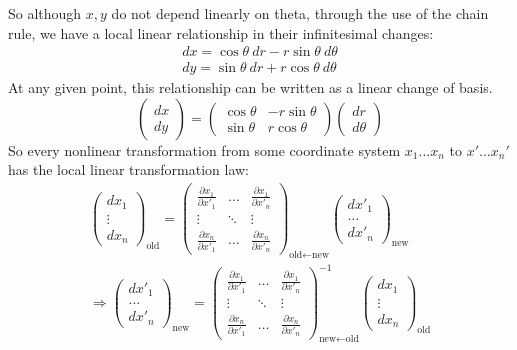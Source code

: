 \documentclass[../master.tex]{subfiles}
\begin{document}
	So although $x,y$ do not depend linearly on theta, through the use of the chain rule, we have a local linear relationship in their infinitesimal changes:
	\begin{align*}
		dx = \cos \theta ~dr - r \sin \theta ~d\theta\\
		dy = \sin \theta ~dr + r \cos \theta ~d\theta
	\end{align*}
	At any given point, this relationship can be written as a linear change of basis.
	\begin{equation*}
		\begin{pmatrix}
			dx \\ dy
		\end{pmatrix}
		 = 
		 \begin{pmatrix}
		 	\cos \theta & - r \sin \theta \\
			\sin \theta & r \cos \theta
		 \end{pmatrix}
		 \begin{pmatrix}
		 	dr \\
			d\theta
		 \end{pmatrix}
	\end{equation*}
	So every nonlinear transformation from some coordinate system $x_1 \dots x_n$ to $x' \dots x_n'$ has the local linear transformation law:
	\begin{align*}
		\begin{pmatrix}
			dx_1 \\ \vdots \\ dx_n 
		\end{pmatrix}_{\text{old}}
		=
	 \begin{pmatrix}
	 	\frac{\partial x_1}{\partial x'_1} & \dots & \frac{\partial x_1}{\partial x'_n} \\
		\vdots & \ddots & \vdots \\
		\frac{\partial x_n}{\partial x'_1} & \dots & \frac{\partial x_n}{\partial x'_n}
	 \end{pmatrix}_{\text{old} \leftarrow \text{new}}
	 \begin{pmatrix}
	 	dx'_1 \\ \dots \\ dx'_n
	 \end{pmatrix}_{\text{new}}\\
	 \Rightarrow 
	 \begin{pmatrix}
	 	dx'_1 \\ \dots \\ dx'_n
	 \end{pmatrix}_{\text{new}}
		=
	 \begin{pmatrix}
	 	\frac{\partial x_1}{\partial x'_1} & \dots & \frac{\partial x_1}{\partial x'_n} \\
		\vdots & \ddots & \vdots \\
		\frac{\partial x_n}{\partial x'_1} & \dots & \frac{\partial x_n}{\partial x'_n}
	 \end{pmatrix}^{-1}_{\text{new} \leftarrow \text{old}}
	\begin{pmatrix}
		dx_1 \\ \vdots \\ dx_n 
	\end{pmatrix}_{\text{old}}
	\end{align*}
\end{document}
